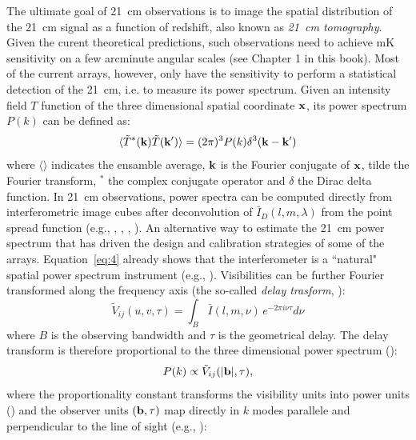 The ultimate goal of 21~cm observations is to image the spatial distribution of the 21~cm signal as a function of redshift, also known as {\it 21~cm tomography}. Given the curent theoretical predictions, such observations need to achieve mK sensitivity on a few arcminute angular scales (see Chapter 1 in this book). Most of the current arrays, however, only have the sensitivity to perform a statistical detection of the 21~cm, i.e. to measure its power spectrum. Given an intensity field $T$ function of the three dimensional spatial coordinate $\bf x$, its power spectrum $P(k)$ can be defined as:
\begin{equation}
\langle {\tilde T}^* ({\bf k}) {\tilde T}({\bf k'}) \rangle = (2 \pi)^3 P(k) \delta^3({\bf k} - {\bf k}')
\label{sec_observables_eq1}
\end{equation}
where $\langle \rangle$ indicates the ensamble average, $\bf k$ is the Fourier conjugate of $\bf x$, tilde the Fourier transform, $^*$ the complex conjugate operator and $\delta$ the Dirac delta function. In 21~cm observations, power spectra can be computed directly from interferometric image cubes after deconvolution of ${\bar I}_D (l,m,\lambda)$ from the point spread function (e.g., \cite{pen09}, \cite{harker10}, \cite{beardsley16}, \cite{patil17}). An alternative way to estimate the 21~cm power spectrum that has driven the design and calibration strategies of some of the arrays. Equation~\ref{eq:4} already shows that the interferometer is a ``natural" spatial power spectrum instrument (e.g., \cite{white99}). Visibilities can be further Fourier transformed along the frequency axis (the so-called {\it delay trasform}, \cite{parsons12a}): 
\begin{equation}
{\tilde V}_{ij} (u,v, \tau) = \int_B {\bar I} (l, m, \nu) \, e^{-2 \pi i \nu \tau} d \nu
\label{sec_observables_eq2}
\end{equation}
where $B$ is the observing bandwidth and $\tau$ is the geometrical delay. The delay transform is therefore proportional to the three dimensional power spectrum (\cite{parsons12b}):
\begin{equation}
P(k) \propto {\tilde V}_{ij} (|{\bf b}|, \tau),
\label{sec_observables_eq3}
\end{equation}
where the proportionality constant transforms the visibility units into power units (\cite{parsons12b}) and the observer units $({\bf b},\tau)$ map directly in $k$ modes parallele and perpendicular to the line of sight (e.g., \cite{morales04}):
